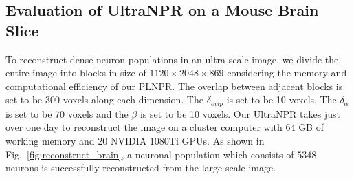 
\subsection{Evaluation of UltraNPR on a Mouse Brain Slice}
\label{sec:exp_UltraNPR}

To reconstruct dense neuron populations in an ultra-scale image, we divide the entire image into blocks in size of $1120\times 2048\times 869$ considering the memory and computational efficiency of our PLNPR.
The overlap between adjacent blocks is set to be $300$ voxels along each dimension. 
The $\delta_{ovlp}$ is set to be 10 voxels.
The $\delta_{\alpha}$ is set to be 70 voxels and the $\beta$ is set to be 10 voxels.
%
Our UltraNPR takes just over one day  to reconstruct the image on a cluster computer with $64$ GB of working memory and 20 NVIDIA 1080Ti GPUs.
%
As shown in Fig.~\ref{fig:reconstruct_brain}, a neuronal population which consists of $5348$ neurons is successfully reconstructed from the large-scale image.



